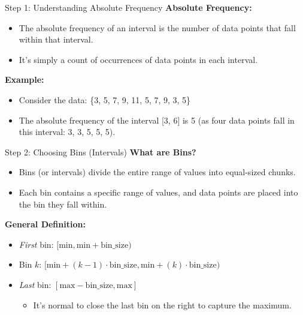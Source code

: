 \documentclass[handout]{beamer} %
\begin{document}
\begin{frame}{Step 1: Understanding Absolute Frequency}
    \textbf{Absolute Frequency:}
    \begin{itemize}
        \item The absolute frequency of an interval is the number of data points that fall within that interval.
        \item It's simply a count of occurrences of data points in each interval.
    \end{itemize}

    \vspace{0.5cm}
    \textbf{Example:}
    \begin{itemize}
        \item Consider the data: \{3, 5, 7, 9, 11, 5, 7, 9, 3, 5\}
        \item The absolute frequency of the interval [3, 6] is 5 (as four data points fall in this interval: 3, 3, 5, 5, 5).
    \end{itemize}
\end{frame}

\begin{frame}{Step 2: Choosing Bins (Intervals)}
    \textbf{What are Bins?}
    \begin{itemize}
        \item Bins (or intervals) divide the entire range of values into equal-sized chunks.
        \item Each bin contains a specific range of values, and data points are placed into the bin they fall within.
    \end{itemize}

    \vspace{0.5cm}

    \textbf{General Definition:}
    \begin{itemize}
        \item \emph{First} bin: \([ \text{min}, \text{min} + \text{bin\_size} )\)
        \item Bin \(k\): \([ \text{min} + (k-1)\cdot\text{bin\_size} , \text{min} +  (k) \cdot \text{bin\_size}  )\)
        \item \emph{Last} bin: \([ \text{max}-\text{bin\_size}, \text{max}   ]\)
        \begin{itemize}
            \item It’s normal to close the last bin on the right to capture the maximum.
        \end{itemize}
    \end{itemize}
\end{frame}
\end{document}

